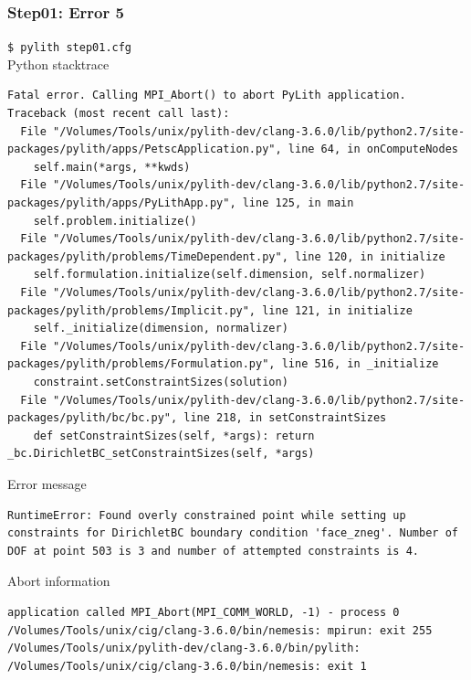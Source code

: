 \documentclass[aspectration=169]{beamer}
\newcommand{\cmd}[1]{{\footnotesize\tt \color{ltred}#1}}
\newcommand{\errlabel}[1]{{\small \color{blue}#1}}
\begin{document}
\begin{frame}[fragile]
  \frametitle{Step01: Error 5}

\cmd{\$ pylith step01.cfg}\\
\errlabel{Python stacktrace}
\begin{lstlisting}
Fatal error. Calling MPI_Abort() to abort PyLith application.
Traceback (most recent call last):
  File "/Volumes/Tools/unix/pylith-dev/clang-3.6.0/lib/python2.7/site-packages/pylith/apps/PetscApplication.py", line 64, in onComputeNodes
    self.main(*args, **kwds)
  File "/Volumes/Tools/unix/pylith-dev/clang-3.6.0/lib/python2.7/site-packages/pylith/apps/PyLithApp.py", line 125, in main
    self.problem.initialize()
  File "/Volumes/Tools/unix/pylith-dev/clang-3.6.0/lib/python2.7/site-packages/pylith/problems/TimeDependent.py", line 120, in initialize
    self.formulation.initialize(self.dimension, self.normalizer)
  File "/Volumes/Tools/unix/pylith-dev/clang-3.6.0/lib/python2.7/site-packages/pylith/problems/Implicit.py", line 121, in initialize
    self._initialize(dimension, normalizer)
  File "/Volumes/Tools/unix/pylith-dev/clang-3.6.0/lib/python2.7/site-packages/pylith/problems/Formulation.py", line 516, in _initialize
    constraint.setConstraintSizes(solution)
  File "/Volumes/Tools/unix/pylith-dev/clang-3.6.0/lib/python2.7/site-packages/pylith/bc/bc.py", line 218, in setConstraintSizes
    def setConstraintSizes(self, *args): return
_bc.DirichletBC_setConstraintSizes(self, *args)
\end{lstlisting}
\errlabel{Error message}
\begin{lstlisting}
RuntimeError: Found overly constrained point while setting up constraints for DirichletBC boundary condition 'face_zneg'. Number of DOF at point 503 is 3 and number of attempted constraints is 4.
\end{lstlisting}
\errlabel{Abort information}
\begin{lstlisting}
application called MPI_Abort(MPI_COMM_WORLD, -1) - process 0
/Volumes/Tools/unix/cig/clang-3.6.0/bin/nemesis: mpirun: exit 255
/Volumes/Tools/unix/pylith-dev/clang-3.6.0/bin/pylith: /Volumes/Tools/unix/cig/clang-3.6.0/bin/nemesis: exit 1
\end{lstlisting}
  
\end{frame}
\end{document}
